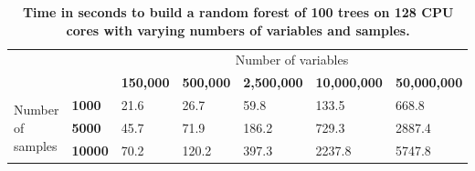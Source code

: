 \documentclass[10pt,letterpaper]{article}
\begin{document}

\begin{table}[!ht]
\begin{adjustwidth}{-1.00in}{0in}
\centering
\caption{
{\bf Time in seconds to build a random forest of 100
  trees on 128 CPU cores with varying numbers of variables and samples.}}
\begin{tabular}{|l|l|l|l|l|l|l|}
\hline
\multicolumn{2}{|l|}{\multirow{2}{*}{}}           & \multicolumn{5}{c|}{Number of variables} \\
\cline{3-7}
\multicolumn{2}{|l|}{}                               & \bf{150,000} & \bf{500,000} & \bf{2,500,000}  & \bf{10,000,000} & \bf{50,000,000} \\
\hline                                                            
\multirow{4}{*}{Number of samples}      & \bf{1000}  & 21.6  & 26.7  & 59.8  & 133.5  & 668.8 \\
                                        & \bf{5000}  & 45.7  & 71.9  & 186.2 & 729.3  & 2887.4 \\
                                        & \bf{10000} & 70.2  & 120.2 & 397.3 & 2237.8 & 5747.8 \\
\hline
\end{tabular}
\begin{flushleft} 
\end{flushleft}
\label{table10}
\end{adjustwidth}
\end{table}
\end{document}

